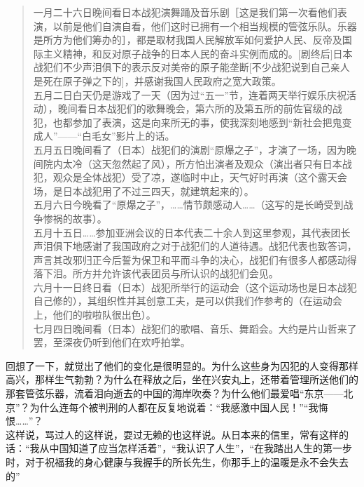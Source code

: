 \begin{quote}
	一月二十六日晚间看日本战犯演舞踊及音乐剧［这是我们第一次看他们表演，以前是他们自演自看，他们这时已拥有一个相当规模的管弦乐队。乐器是所方为他们筹办的］，都是取材我国人民解放军如何爱护人民、反帝及国际主义精神，和反对原子战争的日本人民的奋斗实例而成的。[剧终后]日本战犯们不少声泪俱下的表示反对美帝的原子能垄断[不少战犯说到自己亲人是死在原子弹之下的]，并感谢我国人民政府之宽大政策。\\

五月二日白天仍是游戏了一天（因为过“五一”节，连着两天举行娱乐庆祝活动），晚间看日本战犯们的歌舞晚会，第六所的及第五所的前佐官级的战犯，也都参加了表演，这是向来所无的事，使我深刻地感到“新社会把鬼变成人”——“白毛女”影片上的话。\\

五月五日晚间看了（日本）战犯们的演剧“原爆之子”，才演了一场，因为晚间院内太冷（这天忽然起了风），所方怕出演者及观众（演出者只有日本战犯，观众是全体战犯）受了凉，遂临时中止，天气好时再演（这个露天会场，是日本战犯用了不过三四天，就建筑起来的）。\\

五月六日今晚看了“原爆之子”，……情节颇感动人……（这写的是长崎受到战争惨祸的故事）。\\

五月十五日……参加亚洲会议的日本代表二十余人到这里参观，其代表团长声泪俱下地感谢了我国政府之对于战犯们的人道待遇。战犯代表也致答词，声言其改邪归正今后誓为保卫和平而斗争的决心，战犯们有很多人都感动得落下泪。所方并允许该代表团员与所认识的战犯们会见。\\

六月十一日终日看（日本）战犯所举行的运动会（这个运动场也是日本战犯自己修的），其组织性并其创意工夫，是可以供我们作参考的（在运动会上，他们的啦啦队很出色）。\\

七月四日晚间看（日本）战犯们的歌唱、音乐、舞蹈会。大约是片山哲来了罢，至深夜仍听到他们在欢呼拍掌。\\
\end{quote}

回想了一下，就觉出了他们的变化是很明显的。为什么这些身为囚犯的人变得那样高兴，那样生气勃勃？为什么在释放之后，坐在兴安丸上，还带着管理所送他们的那套管弦乐器，流着泪向逝去的中国的海岸吹奏？为什么他们最爱唱“东京——北京”？为什么连每个被判刑的人都在反复地说着：“我感激中国人民！”“我悔恨……”？\\

这样说，骂过人的这样说，耍过无赖的也这样说。从日本来的信里，常有这样的话：“我从中国知道了应当怎样活着”，“我认识了人生”，“在我踏出人生的第一步时，对于祝福我的身心健康与我握手的所长先生，你那手上的温暖是永不会失去的”\\

